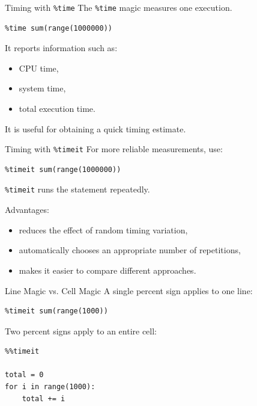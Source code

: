 \documentclass[11pt,aspectratio=43]{beamer}
\begin{document}
\begin{frame}[fragile]{Timing with \texttt{\%time}}
The \texttt{\%time} magic measures one execution.

\begin{lstlisting}
%time sum(range(1000000))
\end{lstlisting}

It reports information such as:
\begin{itemize}
  \item CPU time,
  \item system time,
  \item total execution time.
\end{itemize}

\vspace{0.3cm}
It is useful for obtaining a quick timing estimate.
\end{frame}

\begin{frame}[fragile]{Timing with \texttt{\%timeit}}
For more reliable measurements, use:

\begin{lstlisting}
%timeit sum(range(1000000))
\end{lstlisting}

\texttt{\%timeit} runs the statement repeatedly.

\vspace{0.3cm}
Advantages:
\begin{itemize}
  \item reduces the effect of random timing variation,
  \item automatically chooses an appropriate number of repetitions,
  \item makes it easier to compare different approaches.
\end{itemize}
\end{frame}

\begin{frame}[fragile]{Line Magic vs. Cell Magic}
A single percent sign applies to one line:

\begin{lstlisting}
%timeit sum(range(1000))
\end{lstlisting}

Two percent signs apply to an entire cell:

\begin{lstlisting}
%%timeit

total = 0
for i in range(1000):
    total += i
\end{lstlisting}
\end{frame}
\end{document}
